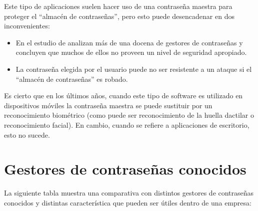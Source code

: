 \documentclass{\ClassPath/viu-tfm-template}
\begin{document}
Este tipo de aplicaciones suelen hacer uso de una contraseña maestra para proteger el “almacén de contraseñas”, pero esto puede desencadenar en dos inconvenientes:

\begin{itemize}
    \item En el estudio de \textcite{belenko2012secure} analizan más de una docena de gestores de contraseñas y concluyen que muchos de ellos no proveen un nivel de seguridad apropiado.

    \item La contraseña elegida por el usuario puede no ser resistente a un ataque si el “almacén de contraseñas” es robado.
\end{itemize}

Es cierto que en los últimos años, cuando este tipo de software es utilizado en dispositivos móviles la contraseña maestra se puede sustituir por un reconocimiento biométrico (como puede ser reconocimiento de la huella dactilar o reconocimiento facial). En cambio, cuando se refiere a aplicaciones de escritorio, esto no sucede.


\section{Gestores de contraseñas conocidos}

La siguiente tabla muestra una comparativa con distintos gestores de contraseñas conocidos y distintas característica que pueden ser útiles dentro de una empresa:
\end{document}
